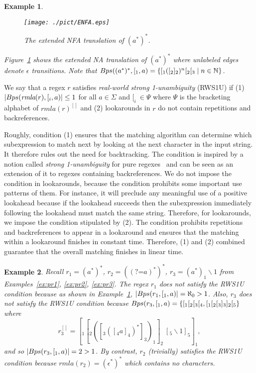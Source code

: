 \documentclass[conference]{IEEEtran}
\newcommand{\computePath}{{\sc Bps}}
\newcommand{\Bracketing}{\Psi}
\newcommand{\ltp}{RWS1U}
\newcommand{\removela}{\textit{rmla}}
\newtheorem{example}{Example}[section]
\begin{document}
\begin{example}
\label{ex:astarstarenfa}
\normalfont
\begin{figure}[t]
  \centering
    \texttt{[image: ./pict/ENFA.eps]}
     \caption{The extended NFA translation of $(a^*)^*$.}
    \label{fig:enfaexample} 
\end{figure} 
Figure~\ref{fig:enfaexample} shows the extended {NA} translation of $(a^*)^*$ where unlabeled edges denote $\epsilon$ transitions.  Note that $\computePath((a^*)^*, [_1, a) = \{ [_1([_2 ]_2)^n [_2 [_3 \;\mid n \in \mathbb{N} \}$.
\end{example}

\begin{definition}[\ltp{}]
\label{def:ltp}
\normalfont
We say that a regex $r$ satisfies {\em real-world strong 1-unambiguity} (\ltp{}) if (1) $|\computePath(\removela(r), [_i, a)| \leq 1$ for all $a \in \Sigma$ and $[_i\: \in \Bracketing$ where $\Bracketing$ is the bracketing alphabet of $\removela(r)^{[]}$ and (2) lookarounds in $r$ do not contain repetitions and backreferences.
\end{definition}
Roughly, condition (1) ensures that the matching algorithm can determine which subexpression to match next by looking at the next character in the input string.  It therefore rules out the need for backtracking.  The condition is inspired by a notion called {\em strong 1-unambiguity} for pure regexes~\cite{10.1007/s00778-005-0169-1} and can be seen as an extension of it to regexes containing backreferences.
We do not impose the condition in lookarounds, because the condition prohibits some important use patterns of them.  For instance, it will preclude any meaningful use of a positive lookahead because if the lookahead succeeds then the subexpression immediately following the lookahead must match the same string.  Therefore, for lookarounds, we impose the condition stipulated by (2).  The condition prohibits repetitions and backreferences to appear in a lookaround and ensures that the matching within a lookaround finishes in constant time.  Therefore, (1) and (2) combined guarantee that the overall matching finishes in linear time.
\begin{example}
\normalfont
Recall $r_1 = (a^*)^*$, $r_2 = ((\mbox{?=}a)^*)^*$, $r_3 = (a^*)_1 \backslash1$ from Examples~\ref{ex:pr1}, \ref{ex:pr2}, \ref{ex:pr3}.
The regex $r_1$ does not satisfy the \ltp{} condition because as shown in Example~\ref{ex:astarstarenfa}, $|\computePath(r_1, [_1, a)| = \aleph_0 > 1$.  Also, $r_3$ does not satisfy the \ltp{} condition because
$\computePath(r_3, [_1, a) = \{ [_1[_2[_3[_4, [_1[_2[_3]_3]_2[_5 \}$ where 
\[
r_3^{[]} = [_1 [_2 ( [_3 ([_4 a ]_4)^* ]_3 )_1 ]_2\: [_5 \backslash 1 ]_5 ]_1,
\]
and so $|\computePath(r_3, [_1, a)| = 2 > 1$.  By contrast, $r_2$ (trivially) satisfies the \ltp{} condition because $\removela(r_2) = (\epsilon^*)^*$ which contains no characters. 
\end{example}
\end{document}
